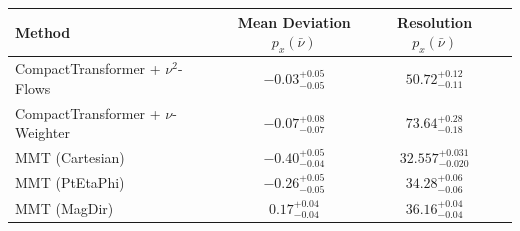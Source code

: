     \begin{tabular}{lccc}
        \toprule
        Method & Mean Deviation $p_{x}(\bar{\nu})$ & Resolution $p_{x}(\bar{\nu})$ \\
        \midrule
        CompactTransformer + $\nu^2$-Flows & $-0.03^{+0.05}_{-0.05}$ & $50.72^{+0.12}_{-0.11}$ \\
        CompactTransformer + $\nu$-Weighter & $-0.07^{+0.08}_{-0.07}$ & $73.64^{+0.28}_{-0.18}$ \\
        MMT (Cartesian) & $-0.40^{+0.05}_{-0.04}$ & $32.557^{+0.031}_{-0.020}$ \\
        MMT (PtEtaPhi) & $-0.26^{+0.05}_{-0.05}$ & $34.28^{+0.06}_{-0.06}$ \\
        MMT (MagDir) & $0.17^{+0.04}_{-0.04}$ & $36.16^{+0.04}_{-0.04}$ \\
        \bottomrule
    \end{tabular}